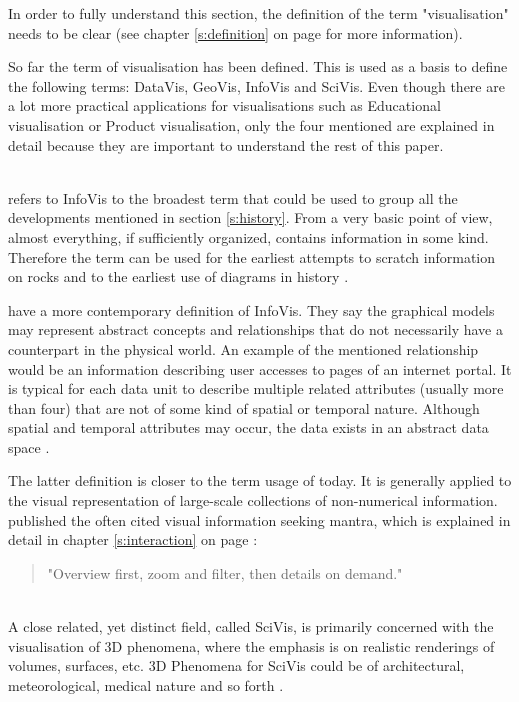 In order to fully understand this section, the definition of the term "visualisation" needs to be clear (see chapter \ref{s:definition} on page \pageref{s:definition} for more information).

So far the term of visualisation has been defined. This is used as a basis to define the following terms: \ac{DataVis}, \ac{GeoVis}, \ac{InfoVis} and \ac{SciVis}. Even though there are a lot more practical applications for visualisations such as Educational visualisation or Product visualisation, only the four mentioned are explained in detail because they are important to understand the rest of this paper.

\begin{enumerate}

 \hfill \\
\citeauthor{Friendly.2001} refers to \ac{InfoVis} to the broadest term that could be used to group all the developments mentioned in section \ref{s:history}. From a very basic point of view, almost everything, if sufficiently organized, contains information in some kind. Therefore the term can be used for the earliest attempts to scratch information on rocks and to the earliest use of diagrams in history .

\citeauthor{Ferreira2003} have a more contemporary definition of \ac{InfoVis}. They say the graphical models may represent abstract concepts and relationships that do not necessarily have a counterpart in the physical world. An example of the mentioned relationship would be an information describing user accesses to pages of an internet portal. It is typical for each data unit to describe multiple related attributes (usually more than four) that are not of some kind of spatial or temporal nature. Although spatial and temporal attributes may occur, the data exists in an abstract data space .

The latter definition is closer to the term usage of today. It is generally applied to the visual representation of large-scale collections of non-numerical information. \citeauthor{Shneiderman1996} published the often cited visual information seeking mantra, which is explained in detail in chapter \ref{s:interaction} on page \pageref{s:interaction} :
\begin{quote}
"Overview first, zoom and filter, then details on demand."
\end{quote}

 \hfill \\
A close related, yet distinct field, called \ac{SciVis}, is primarily concerned with the visualisation of 3D phenomena, where the emphasis is on realistic renderings of volumes, surfaces, etc. 3D Phenomena for \ac{SciVis} could be of architectural, meteorological, medical nature and so forth .


\end{enumerate}

